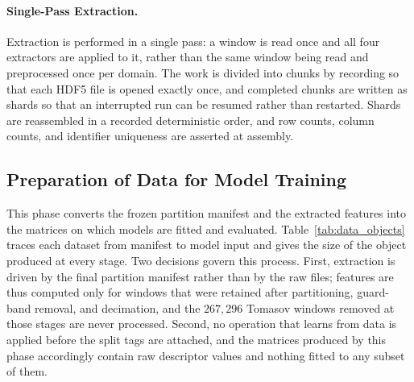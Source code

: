 \paragraph[Single-Pass Extraction]{Single-Pass Extraction.}
Extraction is performed in a single pass: a window is read once and all four extractors are applied to it, rather than the same window being read and preprocessed once per domain. The work is divided into chunks by recording so that each HDF5 file is opened exactly once, and completed chunks are written as shards so that an interrupted run can be resumed rather than restarted. Shards are reassembled in a recorded deterministic order, and row counts, column counts, and identifier uniqueness are asserted at assembly.

\subsection{Preparation of Data for Model Training}
\label{sec:chap3ModelReady}
This phase converts the frozen partition manifest and the extracted features into the matrices on which models are fitted and evaluated. Table~\ref{tab:data_objects} traces each dataset from manifest to model input and gives the size of the object produced at every stage. Two decisions govern this process. First, extraction is driven by the final partition manifest rather than by the raw files; features are thus computed only for windows that were retained after partitioning, guard-band removal, and decimation, and the $267{,}296$ Tomasov windows removed at those stages are never processed. Second, no operation that learns from data is applied before the split tags are attached, and the matrices produced by this phase accordingly contain raw descriptor values and nothing fitted to any subset of them.

